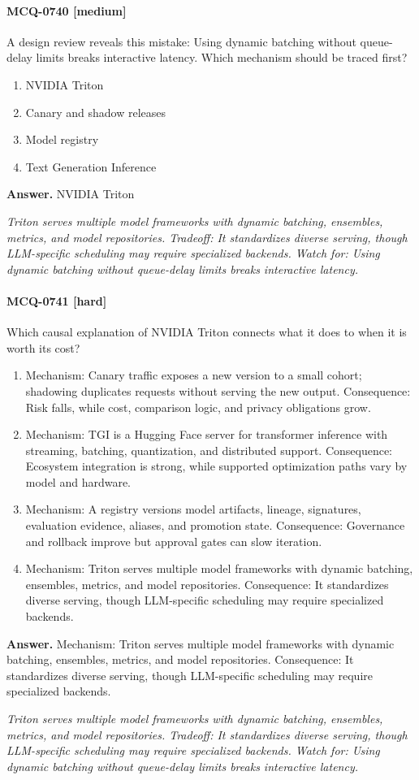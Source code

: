 \paragraph{MCQ-0740 [medium]} A design review reveals this mistake: Using dynamic batching without queue-delay limits breaks interactive latency. Which mechanism should be traced first?
\begin{enumerate}[label=\Alph*.]
\item NVIDIA Triton
\item Canary and shadow releases
\item Model registry
\item Text Generation Inference
\end{enumerate}
\noindent\textbf{Answer.} NVIDIA Triton
\par\textit{Triton serves multiple model frameworks with dynamic batching, ensembles, metrics, and model repositories. Tradeoff: It standardizes diverse serving, though LLM-specific scheduling may require specialized backends. Watch for: Using dynamic batching without queue-delay limits breaks interactive latency.}
\paragraph{MCQ-0741 [hard]} Which causal explanation of NVIDIA Triton connects what it does to when it is worth its cost?
\begin{enumerate}[label=\Alph*.]
\item Mechanism: Canary traffic exposes a new version to a small cohort; shadowing duplicates requests without serving the new output. Consequence: Risk falls, while cost, comparison logic, and privacy obligations grow.
\item Mechanism: TGI is a Hugging Face server for transformer inference with streaming, batching, quantization, and distributed support. Consequence: Ecosystem integration is strong, while supported optimization paths vary by model and hardware.
\item Mechanism: A registry versions model artifacts, lineage, signatures, evaluation evidence, aliases, and promotion state. Consequence: Governance and rollback improve but approval gates can slow iteration.
\item Mechanism: Triton serves multiple model frameworks with dynamic batching, ensembles, metrics, and model repositories. Consequence: It standardizes diverse serving, though LLM-specific scheduling may require specialized backends.
\end{enumerate}
\noindent\textbf{Answer.} Mechanism: Triton serves multiple model frameworks with dynamic batching, ensembles, metrics, and model repositories. Consequence: It standardizes diverse serving, though LLM-specific scheduling may require specialized backends.
\par\textit{Triton serves multiple model frameworks with dynamic batching, ensembles, metrics, and model repositories. Tradeoff: It standardizes diverse serving, though LLM-specific scheduling may require specialized backends. Watch for: Using dynamic batching without queue-delay limits breaks interactive latency.}
